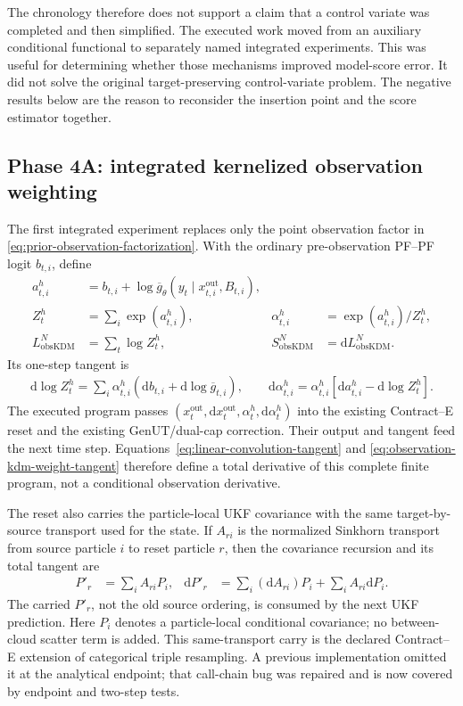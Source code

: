 \documentclass[11pt]{article}
\newcommand{\dd}{\mathrm{d}}
\newcommand{\GenUT}{\ensuremath{\mathrm{GenUT}}}
\begin{document}
The chronology therefore does not support a claim that a control variate was
completed and then simplified. The executed work moved from an auxiliary
conditional functional to separately named integrated experiments. This was
useful for determining whether those mechanisms improved model-score error.
It did not solve the original target-preserving control-variate problem.
The negative results below are the reason to reconsider the insertion point
and the score estimator together.


\subsection{Phase 4A: integrated kernelized observation weighting}

The first integrated experiment replaces only the point observation factor in
\eqref{eq:prior-observation-factorization}.  With the ordinary
pre-observation PF--PF logit $b_{t,i}$, define
\begin{align}
 a^h_{t,i}&=b_{t,i}+\log\overline g_\theta(
   y_t\mid x_{t,i}^{\mathrm{out}},B_{t,i}),\\
 Z^h_t&=\sum_i\exp(a^h_{t,i}), &
 \alpha^h_{t,i}&=\exp(a^h_{t,i})/Z^h_t,\\
 L_{\mathrm{obsKDM}}^N&=\sum_t\log Z^h_t, &
 S_{\mathrm{obsKDM}}^N&=\dd L_{\mathrm{obsKDM}}^N.
 \label{eq:observation-kdm-program}
\end{align}
Its one-step tangent is
\begin{align}
 \dd\log Z^h_t
 =\sum_i\alpha^h_{t,i}
   \left(\dd b_{t,i}+\dd\log\overline g_{t,i}\right),\qquad
 \dd\alpha^h_{t,i}
 =\alpha^h_{t,i}\left[
   \dd a^h_{t,i}-\dd\log Z^h_t\right].
 \label{eq:observation-kdm-weight-tangent}
\end{align}
The executed program passes $(x_t^{\mathrm{out}},\dd x_t^{\mathrm{out}},
\alpha_t^h,\dd\alpha_t^h)$ into the existing Contract--E reset and the
existing \GenUT{}/dual-cap correction.  Their output and tangent feed the next
time step.  Equations~\eqref{eq:linear-convolution-tangent} and
\eqref{eq:observation-kdm-weight-tangent} therefore define a total derivative
of this complete finite program, not a conditional observation derivative.

The reset also carries the particle-local UKF covariance with the same
target-by-source transport used for the state.  If $A_{ri}$ is the normalized
Sinkhorn transport from source particle $i$ to reset particle $r$, then the
covariance recursion and its total tangent are
\begin{align}
 P'_{r} &= \sum_i A_{ri}P_i, &
 \dd P'_{r} &= \sum_i (\dd A_{ri})P_i+
                    \sum_i A_{ri}\dd P_i.\label{eq:covariance-carry}
\end{align}
The carried $P'_r$, not the old source ordering, is consumed by the next UKF
prediction.  Here $P_i$ denotes a particle-local conditional covariance; no
between-cloud scatter term is added.  This same-transport carry is the
declared Contract--E extension of categorical triple resampling.  A previous
implementation omitted it at the analytical endpoint; that call-chain bug
was repaired and is now covered by endpoint and two-step tests.
\end{document}
